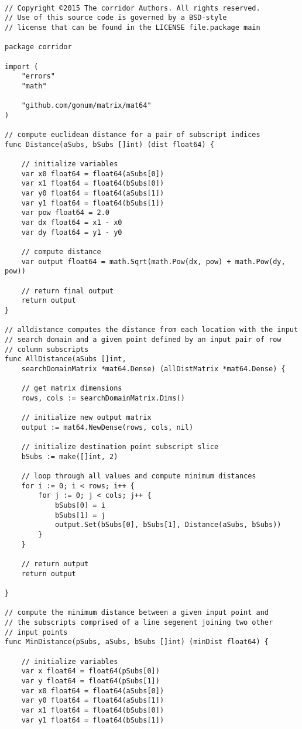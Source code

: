 \begin{lstlisting}[basicstyle=\tiny]

// Copyright ©2015 The corridor Authors. All rights reserved.
// Use of this source code is governed by a BSD-style
// license that can be found in the LICENSE file.package main

package corridor

import (
	"errors"
	"math"

	"github.com/gonum/matrix/mat64"
)

// compute euclidean distance for a pair of subscript indices
func Distance(aSubs, bSubs []int) (dist float64) {

	// initialize variables
	var x0 float64 = float64(aSubs[0])
	var x1 float64 = float64(bSubs[0])
	var y0 float64 = float64(aSubs[1])
	var y1 float64 = float64(bSubs[1])
	var pow float64 = 2.0
	var dx float64 = x1 - x0
	var dy float64 = y1 - y0

	// compute distance
	var output float64 = math.Sqrt(math.Pow(dx, pow) + math.Pow(dy, pow))

	// return final output
	return output
}

// alldistance computes the distance from each location with the input
// search domain and a given point defined by an input pair of row
// column subscripts
func AllDistance(aSubs []int, 
    searchDomainMatrix *mat64.Dense) (allDistMatrix *mat64.Dense) {

	// get matrix dimensions
	rows, cols := searchDomainMatrix.Dims()

	// initialize new output matrix
	output := mat64.NewDense(rows, cols, nil)

	// initialize destination point subscript slice
	bSubs := make([]int, 2)

	// loop through all values and compute minimum distances
	for i := 0; i < rows; i++ {
		for j := 0; j < cols; j++ {
			bSubs[0] = i
			bSubs[1] = j
			output.Set(bSubs[0], bSubs[1], Distance(aSubs, bSubs))
		}
	}

	// return output
	return output

}

// compute the minimum distance between a given input point and
// the subscripts comprised of a line segement joining two other
// input points
func MinDistance(pSubs, aSubs, bSubs []int) (minDist float64) {

	// initialize variables
	var x float64 = float64(pSubs[0])
	var y float64 = float64(pSubs[1])
	var x0 float64 = float64(aSubs[0])
	var y0 float64 = float64(aSubs[1])
	var x1 float64 = float64(bSubs[0])
	var y1 float64 = float64(bSubs[1])


\end{lstlisting}
